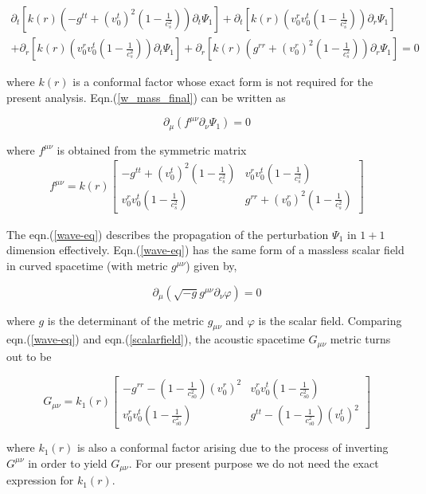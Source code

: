 \documentclass[12pt]{article}
\begin{document}
 \begin{eqnarray}\label{w_mass_final_iso}
 \partial_t\left[ k(r)\left(-g^{tt}+(v^t_0)^2(1-\frac{1}{c_s^2}) \right)\partial_t \Psi_1\right]+\partial_t\left[ k(r)\left(v^r_0v_0^t(1-\frac{1}{c_s^2}) \right)\partial_r \Psi_1\right] \nonumber\\
 +\partial_r \left[ k(r)\left(v^r_0v_0^t(1-\frac{1}{c_s^2}) \right)\partial_t \Psi_1\right]+\partial_r \left[ k(r)\left( g^{rr}+(v^r_0)^2(1-\frac{1}{c_s^2})\right)\partial_r \Psi_1\right]=0
 \end{eqnarray}
 
 where $k(r)$ is a conformal factor whose exact form is not required for the present analysis. Eqn.(\ref{w_mass_final}) can be written as
 
 \begin{equation}\label{wave-eq}
 \partial_\mu (f^{\mu\nu}\partial_\nu \Psi_1)=0
 \end{equation}
 
 \noindent
 where $f^{\mu\nu}$ is obtained from the symmetric matrix
 \begin{eqnarray}\label{f_mass}
 f^{\mu\nu}= k(r) \left[\begin{array}{cc}
 -g^{tt}+(v^t_0)^2(1-\frac{1 }{c_s^2}) & v^r_0v_0^t(1-\frac{1}{c_s^2})\\
 v^r_0v_0^t(1-\frac{1}{c_s^2}) & g^{rr}+(v^r_0)^2(1-\frac{1}{c_s^2})
 \end{array}\right]
 \end{eqnarray}
 
 \noindent
 The eqn.(\ref{wave-eq}) describes the propagation of the perturbation $ \Psi_1 $ in $1+1$ dimension effectively. Eqn.(\ref{wave-eq}) has the same form of a massless scalar field in curved spacetime (with metric $ g^{\mu\nu} $) given by,
 
 \begin{equation}\label{scalarfield}
 \partial_\mu(\sqrt{-g}g^{\mu\nu}\partial_\nu \varphi)=0
 \end{equation}
 
 \noindent
 where $ g $ is the determinant of the metric $ g_{\mu\nu} $ and $\varphi$ is the scalar field. Comparing eqn.(\ref{wave-eq}) and eqn.(\ref{scalarfield}), the acoustic spacetime $ G_{\mu\nu} $ metric turns out to be
 
 \begin{equation}\label{Gmunu}
 G_{\mu\nu} = k_1 (r) \begin{bmatrix}
 -g^{rr}-(1-\frac{1}{c_{s0}^2})(v^r_0)^2 & v^r_0 v^t_0(1-\frac{1}{c_{s0}^2})  \\
 v^r_0 v^t_0(1-\frac{1}{c_{s0}^2})  & g^{tt}-(1-\frac{1}{c_{s0}^2}) (v^t_0)^2
 \end{bmatrix}
 \end{equation}
 
 \noindent
 where $ k_1 (r) $ is also a conformal factor arising due to the process of inverting $ G^{\mu\nu} $ in order to yield $ G_{\mu\nu} $. For our present purpose we do not need the exact expression for $ k_1 (r) $.
 
\end{document}
